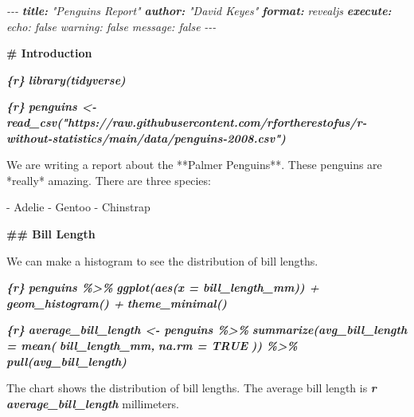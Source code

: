 \documentclass[
]{book}
\newenvironment{Shaded}{\begin{snugshade}}{\end{snugshade}}
\newcommand{\AnnotationTok}[1]{\textcolor[rgb]{0.56,0.35,0.01}{\textbf{\textit{#1}}}}
\newcommand{\CommentTok}[1]{\textcolor[rgb]{0.56,0.35,0.01}{\textit{#1}}}
\newcommand{\FunctionTok}[1]{\textcolor[rgb]{0.13,0.29,0.53}{\textbf{#1}}}
\newcommand{\InformationTok}[1]{\textcolor[rgb]{0.56,0.35,0.01}{\textbf{\textit{#1}}}}
\newcommand{\NormalTok}[1]{#1}
\newcommand{\SpecialStringTok}[1]{\textcolor[rgb]{0.31,0.60,0.02}{#1}}
\begin{document}
\begin{Shaded}
\begin{Highlighting}[]
\CommentTok{{-}{-}{-}}
\AnnotationTok{title:}\CommentTok{ "Penguins Report"}
\AnnotationTok{author:}\CommentTok{ "David Keyes"}
\AnnotationTok{format:}\CommentTok{ revealjs}
\AnnotationTok{execute:}\CommentTok{ }
\CommentTok{  echo: false}
\CommentTok{  warning: false}
\CommentTok{  message: false}
\CommentTok{{-}{-}{-}}

\FunctionTok{\# Introduction}

\InformationTok{\textasciigrave{}\textasciigrave{}\textasciigrave{}\{r\}}
\InformationTok{library(tidyverse)}
\InformationTok{\textasciigrave{}\textasciigrave{}\textasciigrave{}}

\InformationTok{\textasciigrave{}\textasciigrave{}\textasciigrave{}\{r\}}
\InformationTok{penguins \textless{}{-} read\_csv("https://raw.githubusercontent.com/rfortherestofus/r{-}without{-}statistics/main/data/penguins{-}2008.csv")}
\InformationTok{\textasciigrave{}\textasciigrave{}\textasciigrave{}}

\NormalTok{We are writing a report about the **Palmer Penguins**. These penguins are *really* amazing. There are three species:}

\SpecialStringTok{{-} }\NormalTok{Adelie}
\SpecialStringTok{{-} }\NormalTok{Gentoo}
\SpecialStringTok{{-} }\NormalTok{Chinstrap}

\FunctionTok{\#\# Bill Length}

\NormalTok{We can make a histogram to see the distribution of bill lengths.}

\InformationTok{\textasciigrave{}\textasciigrave{}\textasciigrave{}\{r\}}
\InformationTok{penguins \%\textgreater{}\%}
\InformationTok{  ggplot(aes(x = bill\_length\_mm)) +}
\InformationTok{  geom\_histogram() +}
\InformationTok{  theme\_minimal()}
\InformationTok{\textasciigrave{}\textasciigrave{}\textasciigrave{}}

\InformationTok{\textasciigrave{}\textasciigrave{}\textasciigrave{}\{r\}}
\InformationTok{average\_bill\_length \textless{}{-} penguins \%\textgreater{}\%}
\InformationTok{  summarize(avg\_bill\_length = mean(}
\InformationTok{    bill\_length\_mm,}
\InformationTok{    na.rm = TRUE}
\InformationTok{  )) \%\textgreater{}\%}
\InformationTok{  pull(avg\_bill\_length)}
\InformationTok{\textasciigrave{}\textasciigrave{}\textasciigrave{}}

\NormalTok{The chart shows the distribution of bill lengths. The average bill length is }\InformationTok{\textasciigrave{}r average\_bill\_length\textasciigrave{}}\NormalTok{ millimeters.}
\end{Highlighting}
\end{Shaded}
\end{document}
